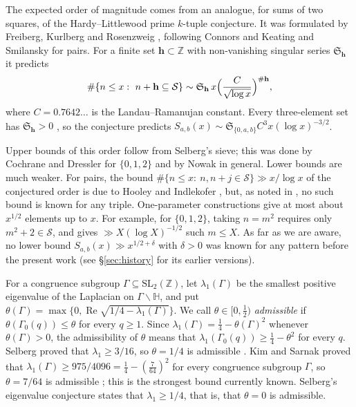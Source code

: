 \documentclass[11pt]{amsart}
\theoremstyle{remark}
\theoremstyle{definition}
\numberwithin{equation}{section}
\newcommand{\Sc}{\mathcal{S}}
\newcommand{\Z}{\mathbb{Z}}
\newcommand{\Hb}{\mathbb{H}}
\newcommand{\SL}{\mathrm{SL}}
\begin{document}
The expected order of magnitude comes from an analogue, for sums of two squares, of the Hardy--Littlewood prime $k$-tuple conjecture. It was formulated by Freiberg, Kurlberg and Rosenzweig \cite[Conjecture~1.1]{FKR}, following Connors and Keating \cite{CK} and Smilansky \cite{Sm} for pairs. For a finite set $\mathbf h\subset\Z$ with non-vanishing singular series $\mathfrak S_{\mathbf h}$ it predicts
\[
\#\{n\le x:\ n+\mathbf h\subseteq\Sc\}\sim\mathfrak S_{\mathbf h}\,x\Bigl(\frac{C}{\sqrt{\log x}}\Bigr)^{\#\mathbf h},
\]
where $C=0.7642\ldots$ is the Landau--Ramanujan constant. Every three-element set has $\mathfrak S_{\mathbf h}>0$ \cite[\S2.1]{FKR}, so the conjecture predicts $S_{a,b}(x)\sim\mathfrak S_{\{0,a,b\}}C^3x(\log x)^{-3/2}$.

Upper bounds of this order follow from Selberg's sieve; this was done by Cochrane and Dressler \cite{CD} for $\{0,1,2\}$ and by Nowak \cite{No} in general. Lower bounds are much weaker. For pairs, the bound $\#\{n\le x:\ n,n+j\in\Sc\}\gg x/\log x$ of the conjectured order is due to Hooley \cite{Ho74} and Indlekofer \cite{In}, but, as noted in \cite{FKR}, no such bound is known for any triple. One-parameter constructions give at most about $x^{1/2}$ elements up to $x$. For example, for $\{0,1,2\}$, taking $n=m^2$ requires only $m^2+2\in\Sc$, and \cite[Theorem~2]{FI78} gives $\gg X(\log X)^{-1/2}$ such $m\le X$. As far as we are aware, no lower bound $S_{a,b}(x)\gg x^{1/2+\delta}$ with $\delta>0$ was known for any pattern before the present work (see \S\ref{sec:history} for its earlier versions).

For a congruence subgroup $\Gamma\subseteq\SL_2(\Z)$, let $\lambda_1(\Gamma)$ be the smallest positive eigenvalue of the Laplacian on $\Gamma\backslash\Hb$, and put $\theta(\Gamma)=\max\{0,\operatorname{Re}\sqrt{1/4-\lambda_1(\Gamma)}\}$. We call $\theta\in[0,\frac12)$ \emph{admissible} if $\theta(\Gamma_0(q))\le\theta$ for every $q\ge1$. Since $\lambda_1(\Gamma)=\frac14-\theta(\Gamma)^2$ whenever $\theta(\Gamma)>0$, the admissibility of $\theta$ means that $\lambda_1(\Gamma_0(q))\ge\frac14-\theta^2$ for every $q$. Selberg proved that $\lambda_1\ge3/16$, so $\theta=1/4$ is admissible \cite{Sel}. Kim and Sarnak proved that $\lambda_1(\Gamma)\ge975/4096=\frac14-(\frac7{64})^2$ for every congruence subgroup $\Gamma$, so $\theta=7/64$ is admissible \cite[Appendix~2]{Kim}; this is the strongest bound currently known. Selberg's eigenvalue conjecture states that $\lambda_1\ge1/4$, that is, that $\theta=0$ is admissible.
\end{document}

